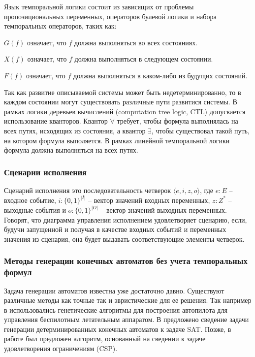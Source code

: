 \documentclass[14pt]{extarticle}
\theoremstyle{plain}
\theoremstyle{definition}
\begin{document}
Язык темпоральной логики состоит из зависящих от проблемы
пропозициональных переменных, операторов булевой логики и набора темпоральных
операторов, таких как:

$G(f)$ означает, что $f$ должна выполняться во всех состояниях.

$X(f)$ означает, что $f$ должна выполняться в следующем состоянии.

$F(f)$ означает, что $f$ должна выполняться в каком-либо из будущих состояний.

Так как развитие описываемой системы может быть недетерминированно, то в каждом
состоянии могут существовать различные пути развитися системы. В рамках логики
деревьев вычислений (computation tree logic, CTL) допускается использование кванторов. Квантор $\forall$
требует, чтобы формула выполнялась на всех путях, исходящих из состояния, а
квантор $\exists$, чтобы существовал такой путь, на котором формула выполяется.
В рамках линейной темпоральной логики формула должна выполняться на всех путях.

\subsubsection{Сценарии исполнения}

Сценарий исполнения это последовательность четверок $\langle e, i, z, o
\rangle$, где $e : E$ -- входное событие, $i : \{0, 1\}^{|I|}$ -- вектор
значений входных переменных, $z : Z^*$ -- выходные события и $o :
\{0, 1\}^{|O|}$ -- вектор значений выходных переменных. Говорят, что диаграмма
управления исполнением удовлетворяет сценарию, если, будучи запущенной и
получая в качестве входных событий и переменных значения из сценария, она будет
выдавать соответствующие элементы четверок.

\subsubsection{Методы генерации конечных автоматов без учета темпоральных формул}

Задача генерации автоматов известна уже достаточно давно. Существуют различные методы
как точные так и эвристические для ее решения. Так например в \cite{ps, ask} использовались
генетические алгоритмы для построения автопилота для управления беспилотным
летательным аппаратом. В \cite{sat} предложено сведение задачи генерации детерминированных конечных автоматов
к задаче SAT. Позже, в работе \cite{csp} был предложен алгоритм, основанный на сведении к задаче
удовлетворения ограничениям (CSP).
\end{document}

